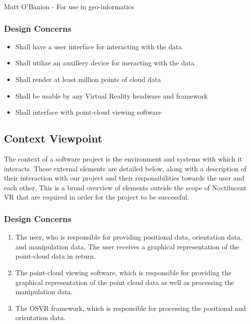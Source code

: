 \documentclass{article}
\begin{document}
Matt O'Banion - For use in geo-informatics

\subsubsection{Design Concerns}

\begin{itemize}
 \item Shall have a user interface for interacting with the data
 \item Shall utilize an auxillery device for ineracting with the data
 \item Shall render at least million points of cloud data
 \item Shall be usable by any Virtual Reality headware and framework
 \item Shall interface with point-cloud viewing software
\end{itemize}

\subsection{Context Viewpoint}

The context of a software project is the environment and systems with which it interacts. 
These external elements are detailed below, along with a description of their interaction with our project and their responsibilities towards the user and each other. 
This is a broad overview of elements outside the scope of Noctilucent VR that are required in order for the project to be successful. 

\subsubsection{Design Concerns}

\begin{enumerate}
\item The user, who is responsible for providing positional data, orientation data, and manipulation data. 
The user receives a graphical representation of the point-cloud data in return.
\item The point-cloud viewing software, which is responsible for providing the graphical representation of the point cloud data as well as processing the manipulation data.
\item The OSVR framework, which is responsible for processing the positional and orientation data.  
\end{enumerate}
\end{document}
